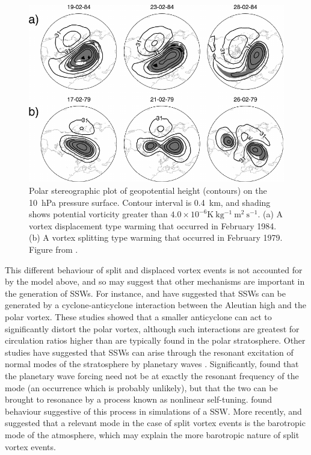 \begin{figure}
 \centering
 \noindent\includegraphics[width=\textwidth]{figures/chapter-intro/charlton_polvani_SSW.pdf}
 \caption[Examples of a split and displaced vortex event from
 \citet{Charlton2007}]{Polar stereographic plot of geopotential height
   (contours) on the 10~hPa pressure surface. Contour interval is 0.4~km, and
   shading shows potential vorticity greater than
   $4.0 \times 10^{-6} \mathrm{K~kg^{-1}~m^2~s^{-1}}$. (a) A vortex displacement
   type warming that occurred in February 1984. (b) A vortex splitting type
   warming that occurred in February 1979. Figure from \citet{Charlton2007}.}
 \label{fig:charlton_polvani_ssw}
\end{figure}

This different behaviour of split and displaced vortex events is not accounted
for by the \citet{Matsuno1970, Matsuno1971} model above, and so may suggest that
other mechanisms are important in the generation of SSWs. For instance,
\citet{ONeill1988} and \citet{Scott2006} have suggested that SSWs can be
generated by a cyclone-anticyclone interaction between the Aleutian high and the
polar vortex. These studies showed that a smaller anticyclone can act to
significantly distort the polar vortex, although such interactions are greatest
for circulation ratios higher than are typically found in the polar
stratosphere. Other studies have suggested that SSWs can arise through the
resonant excitation of normal modes of the stratosphere by planetary waves
\citep{Tung1979}. Significantly, \citet{Plumb1981} found that the planetary wave
forcing need not be at exactly the resonant frequency of the mode (an occurrence
which is probably unlikely), but that the two can be brought to resonance by a
process known as nonlinear self-tuning. \citet{Smith1989} found behaviour
suggestive of this process in simulations of a SSW. More recently,
\citet{Esler2005} and \citet{Esler2006} suggested that a relevant mode in the
case of split vortex events is the barotropic mode of the atmosphere, which may
explain the more barotropic nature of split vortex events.

